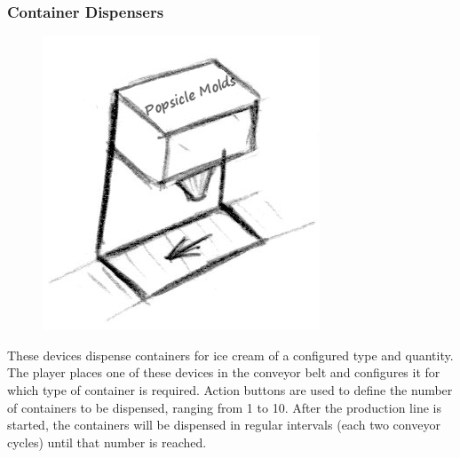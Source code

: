 \documentclass[a4paper]{scrartcl}
\begin{document}
		\subsubsection{Container Dispensers}
            \begin{minipage}[t][6em][t]{\textwidth}
                \begin{figure}
                    \vspace{-20pt}
                    \includegraphics[scale=1]{devices/container_dispenser}
                    \vspace{-20pt}
                \end{figure}

                These devices dispense containers for ice cream of a configured type and quantity. The player places one of these devices in the conveyor belt and configures it for which type of container is required. Action buttons are used to define the number of containers to be dispensed, ranging from 1 to 10. After the production line is started, the containers will be dispensed in regular intervals (each two conveyor cycles) until that number is reached.
            \end{minipage}			
\end{document}
